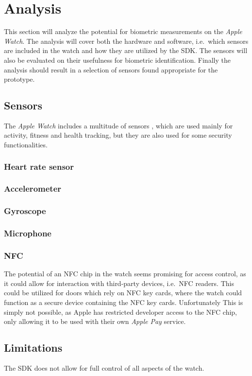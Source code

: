 \section{Analysis}
This section will analyze the potential for biometric measurements on the
\textit{Apple Watch}. The analysis will cover both the hardware and
software, i.e.\ which sensors are included in the watch and how they are 
utilized by the SDK. The sensors will also be evaluated on their usefulness 
for biometric identification. Finally the analysis should result in a
selection of sensors found appropriate for the prototype.

\subsection{Sensors}
The \textit{Apple Watch} includes a multitude of sensors \cite{watchspecs}, 
which are used mainly for activity, fitness and health tracking, but they are
also used for some security functionalities.

\subsubsection{Heart rate sensor}

\subsubsection{Accelerometer}

\subsubsection{Gyroscope}

\subsubsection{Microphone}


\subsubsection{NFC}
The potential of an NFC chip in the watch seems promising for access control, as
it could allow for interaction with third-party devices, i.e.\ NFC readers. This
could be utilized for doors which rely on NFC key cards, where the watch could
function as a secure device containing the NFC key cards. 
Unfortunately This is simply not possible, as Apple has restricted developer 
access to the NFC chip, only allowing it to be used with their own \textit{Apple
    Pay} service. 

\subsection{Limitations}
The SDK does not allow for full control of all aspects of the watch. 
